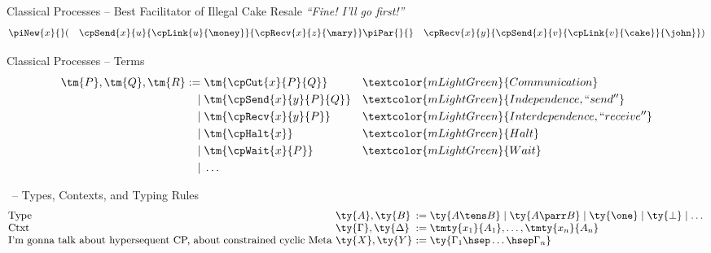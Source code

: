 \documentclass[aspectratio=169,xcolor={dvipsnames,table}]{beamer}
\newcommand*{\comment}[1]{\textcolor{mLightGreen}{#1}}
\begin{document}
\begin{frame}{Classical Processes -- Best Facilitator of Illegal Cake Resale}
  \centering
  \vfill
  \Huge
  \textit{``Fine! I'll go first!''}
  \vfill
  \Large
  \[\!
    \begin{aligned}
      \piNew{x}{}
      & ( & \cpSend{x}{u}{\cpLink{u}{\money}}{\cpRecv{x}{z}{\mary}}
          & \piPar{}{}
          & \cpRecv{x}{y}{\cpSend{x}{v}{\cpLink{v}{\cake}}{\john}}
          )
    \end{aligned}
  \]
  \vfill
\end{frame}

\begin{frame}{Classical Processes -- Terms}
  \centering\Large
  \vfill
  \[\!
    \begin{aligned}
      \tm{P}, \tm{Q}, \tm{R}
           :=& \; \tm{\cpCut{x}{P}{Q}}
      &      &\comment{Communication}
      \\ \mid& \; \tm{\cpSend{x}{y}{P}{Q}}
      &      &\comment{Independence, ``send''}
      \\ \mid& \; \tm{\cpRecv{x}{y}{P}}
      &      &\comment{Interdependence, ``receive''}
      \\ \mid& \; \tm{\cpHalt{x}}
      &      &\comment{Halt}
      \\ \mid& \; \tm{\cpWait{x}{P}}
      &      &\comment{Wait}
      \\ \mid& \; \dots
    \end{aligned}
  \]  
\end{frame}

\begin{frame}[label=hccp1]{\hccp\ -- Types, Contexts, and Typing Rules}
  \centering\Large
  \vfill
  \[\!
    \arraycolsep=0.16667em
    \begin{array}{lll}
      \text{Type} & \ty{A},\ty{B}
      & := \ty{A \tens B} \mid \ty{A \parr B}
        \mid \ty{\one} \mid \ty{\bot}
        \mid \dots
      \\
      \text{Ctxt} & \ty{\Gamma},\ty{\Delta}
      & := \tmty{x_1}{A_1},\dots,\tmty{x_n}{A_n}
      \\
      \text{I'm gonna talk about hypersequent CP, about constrained cyclic Meta} & \ty{X},\ty{Y}
      & := \ty{\Gamma_1\hsep\dots\hsep\Gamma_n}
    \end{array}
  \]
  \begin{center}
    \hccpInfAx
    \hccpInfHalt
  \end{center}
  \begin{center}
    \hccpInfCycle
    \hccpInfMix
  \end{center}
\end{frame}
\end{document}
